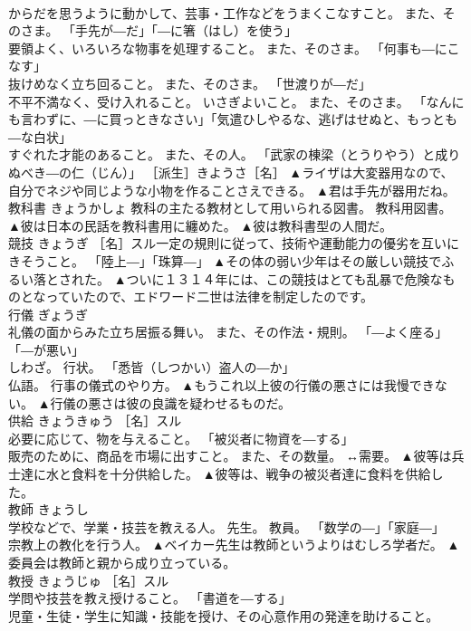 \documentclass[8pt]{extreport}
\begin{document}
\begin{CJK}{UTF8}{min}
\\	からだを思うように動かして、芸事・工作などをうまくこなすこと。 また、そのさま。 「手先が―だ」「―に箸（はし）を使う」 
\\	要領よく、いろいろな物事を処理すること。 また、そのさま。 「何事も―にこなす」 
\\	抜けめなく立ち回ること。 また、そのさま。 「世渡りが―だ」 
\\	不平不満なく、受け入れること。 いさぎよいこと。 また、そのさま。 「なんにも言わずに、―に買っときなさい」「気遣ひしやるな、逃げはせぬと、もっとも―な白状」 
\\	すぐれた才能のあること。 また、その人。 「武家の棟梁（とうりやう）と成りぬべき―の仁（じん）」 ［派生］きようさ［名］	▲ライザは大変器用なので、自分でネジや同じような小物を作ることさえできる。 ▲君は手先が器用だね。
\\	教科書	きょうかしょ	教科の主たる教材として用いられる図書。 教科用図書。	▲彼は日本の民話を教科書用に纏めた。 ▲彼は教科書型の人間だ。
\\	競技	きょうぎ	［名］スル一定の規則に従って、技術や運動能力の優劣を互いにきそうこと。 「陸上―」「珠算―」	▲その体の弱い少年はその厳しい競技でふるい落とされた。 ▲ついに１３１４年には、この競技はとても乱暴で危険なものとなっていたので、エドワード二世は法律を制定したのです。
\\	行儀	ぎょうぎ	
\\	礼儀の面からみた立ち居振る舞い。 また、その作法・規則。 「―よく座る」「―が悪い」 
\\	しわざ。 行状。 「悉皆（しつかい）盗人の―か」 
\\	仏語。 行事の儀式のやり方。	▲もうこれ以上彼の行儀の悪さには我慢できない。 ▲行儀の悪さは彼の良識を疑わせるものだ。
\\	供給	きょうきゅう	［名］スル 
\\	必要に応じて、物を与えること。 「被災者に物資を―する」 
\\	販売のために、商品を市場に出すこと。 また、その数量。 ↔需要。	▲彼等は兵士達に水と食料を十分供給した。 ▲彼等は、戦争の被災者達に食料を供給した。
\\	教師	きょうし	
\\	学校などで、学業・技芸を教える人。 先生。 教員。 「数学の―」「家庭―」 
\\	宗教上の教化を行う人。	▲ベイカー先生は教師というよりはむしろ学者だ。 ▲委員会は教師と親から成り立っている。
\\	教授	きょうじゅ	［名］スル 
\\	学問や技芸を教え授けること。 「書道を―する」 
\\	児童・生徒・学生に知識・技能を授け、その心意作用の発達を助けること。 

\end{CJK}
\end{document}

